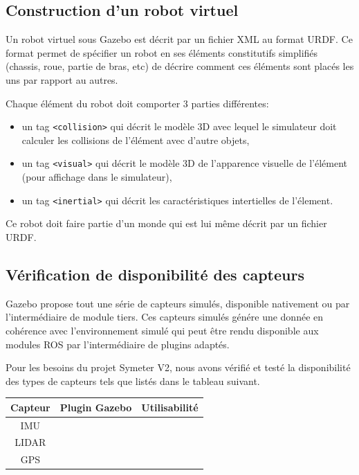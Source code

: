\documentclass[12pt,a4paper]{report}
\begin{document}
		\subsection{Construction d'un robot virtuel}
		
		Un robot virtuel sous Gazebo est décrit par un fichier XML au format URDF. Ce format permet de spécifier un robot en ses éléments constitutifs simplifiés (chassis, roue, partie de bras, etc) de décrire comment ces éléments sont placés les uns par rapport au autres.
		
		\para Chaque élément  du robot doit comporter 3 parties différentes:
		\begin{itemize}
			\item un tag \verb|<collision>| qui décrit le modèle 3D avec lequel le simulateur doit calculer les collisions de l'élément avec d'autre objets,
			\item un tag \verb|<visual>| qui décrit le modèle 3D de l'apparence visuelle de l'élément (pour affichage dans le simulateur),
			\item un tag \verb|<inertial>| qui décrit les caractéristiques intertielles de l'élement.
		\end{itemize}
		
		\para Ce robot doit faire partie d'un monde qui est lui même décrit par un fichier URDF. 
		

		
		
		\subsection{Vérification de disponibilité des capteurs}
		
		Gazebo propose tout une série de capteurs simulés, disponible nativement ou par l'intermédiaire de module tiers. Ces capteurs simulés génére une donnée en cohérence avec l'environnement simulé qui peut être rendu disponible aux modules ROS par l'intermédiaire de plugins adaptés.
		
		\para Pour les besoins du projet Symeter V2, nous avons vérifié et testé la disponibilité des types de capteurs tels que listés dans le tableau suivant.
		\newline
		
		\begin{tabular}{|c|c|c|}
			\hline 
			Capteur & Plugin Gazebo & Utilisabilité \\ 
			\hline 
			IMU &  &  \\ 
			\hline 
			LIDAR &  &  \\ 
			\hline 
			GPS &  &  \\ 
			\hline 
		\end{tabular} 
	
\end{document}

